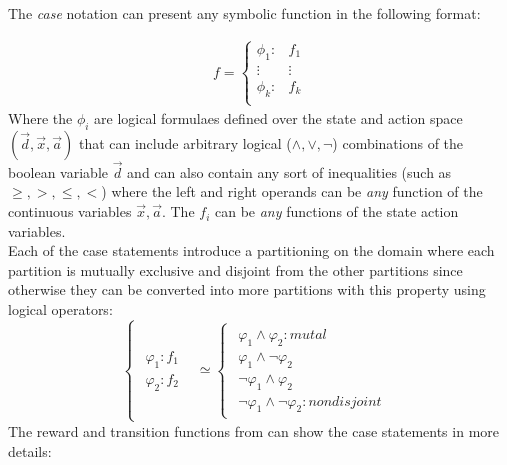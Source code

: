 \documentclass[letterpaper]{article}
\renewcommand{\-}{\text{-}}
\begin{document}
The \textit{case} notation can present any symbolic function in the following format: 

{%
\begin{align*}
f = 
\begin{cases}
  \phi_1: & f_1 \\ 
 \vdots&\vdots\\ 
  \phi_k: & f_k \\ 
\end{cases}
\end{align*}
}
Where the $\phi_i$ are logical formulaes defined over the state and action space $(\vec{d},\vec{x},\vec{a})$ that can include arbitrary logical ($\land,\lor,\neg$) combinations of the boolean variable $\vec{d}$ and can also contain any sort of
inequalities (such as $\geq,>,\leq,<$) where the left and right operands can be \emph{any} function of the continuous variables $\vec{x},\vec{a}$. 
The $f_i$ can be \emph{any} functions of the state action variables.  
\\
Each of the case statements introduce a partitioning on the domain where each partition is mutually exclusive and disjoint from the other partitions since otherwise they can be converted into more partitions with this property using logical operators: 
{%
\[
\begin{cases}
\begin{array}{c}
\varphi_{1}:f_{1}\\
\varphi_{2}:f_{2}
\end{array} & \simeq\begin{cases}
\begin{array}{c}
\varphi_{1}\wedge\varphi_{2}:mutal\\
\varphi_{1}\wedge\neg\varphi_{2}\\
\neg\varphi_{1}\wedge\varphi_{2}\\
\neg\varphi_{1}\wedge\neg\varphi_{2}:nondisjoint
\end{array}\end{cases}\end{cases}
\]
}
The reward and transition functions from \InventoryControl can show the case statements in more details:
\end{document}
